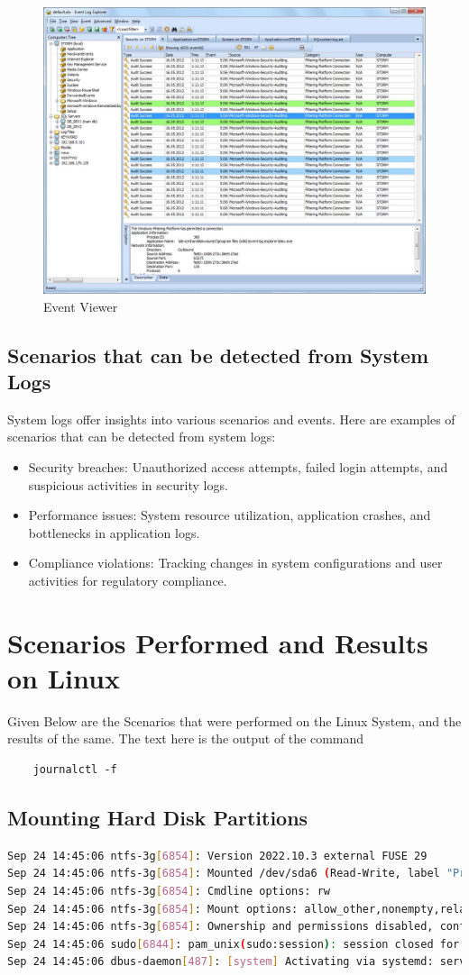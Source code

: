 \documentclass[11pt]{article}
\begin{document}
\begin{figure}[H]
    \centering
    \includegraphics[width=.45\textwidth]{Event logger/Event logger_0.jpg}
    \caption{Event Viewer}
\end{figure}
\subsection{Scenarios that can be detected from System Logs}
System logs offer insights into various scenarios and events. Here are examples of scenarios that can be detected from system logs:
\begin{itemize}
    \item Security breaches: Unauthorized access attempts, failed login attempts, and suspicious activities in security logs.
    \item Performance issues: System resource utilization, application crashes, and bottlenecks in application logs.
    \item Compliance violations: Tracking changes in system configurations and user activities for regulatory compliance.
\end{itemize}


\section{Scenarios Performed and Results on Linux}
Given Below are the Scenarios that were performed on the Linux System, and the results of the same. The text here is the output of the command
\begin{verbatim}
    journalctl -f
\end{verbatim}
\subsection{Mounting Hard Disk Partitions}

\begin{lstlisting}[language=bash]
Sep 24 14:45:06 ntfs-3g[6854]: Version 2022.10.3 external FUSE 29
Sep 24 14:45:06 ntfs-3g[6854]: Mounted /dev/sda6 (Read-Write, label "Programs", NTFS 3.1)
Sep 24 14:45:06 ntfs-3g[6854]: Cmdline options: rw
Sep 24 14:45:06 ntfs-3g[6854]: Mount options: allow_other,nonempty,relatime,rw,fsname=/dev/sda6,blkdev,blksize=4096
Sep 24 14:45:06 ntfs-3g[6854]: Ownership and permissions disabled, configuration type 7
Sep 24 14:45:06 sudo[6844]: pam_unix(sudo:session): session closed for user root
Sep 24 14:45:06 dbus-daemon[487]: [system] Activating via systemd: service name='org.freedesktop.hostname1' unit='dbus-org.freedesktop.hostname1.service' requested by ':1.86' (uid=1000 pid=2564 comm="/usr/bin/gnome-shell")
\end{lstlisting}
\end{document}
